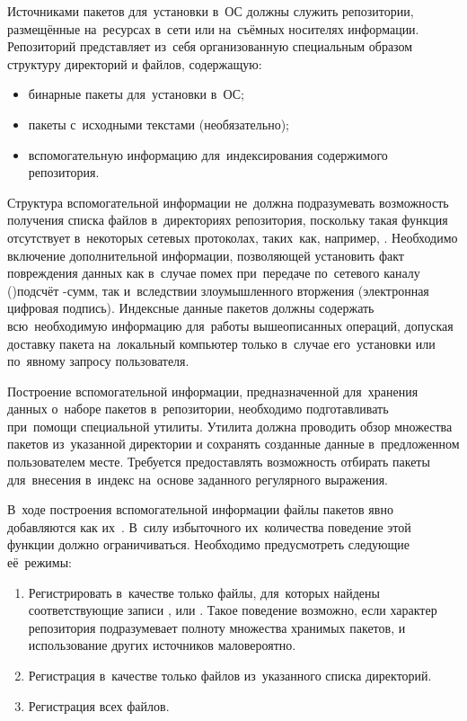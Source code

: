 Источниками пакетов для~установки в~ОС должны служить репозитории,
размещённые на~ресурсах в~сети или на~съёмных носителях информации.
Репозиторий представляет из~себя организованную специальным образом структуру директорий и файлов, содержащую:

\begin{itemize}
\item{бинарные пакеты для~установки в~ОС;}
\item{пакеты с~исходными текстами (необязательно);}
\item{вспомогательную информацию для~индексирования содержимого репозитория.}
\end{itemize}

Структура вспомогательной информации не~должна подразумевать возможность получения списка файлов в~директориях репозитория,
поскольку такая функция отсутствует в~некоторых сетевых протоколах, таких~как, например, .
Необходимо включение дополнительной информации, позволяющей установить факт повреждения данных как в~случае 
помех при~передаче по~сетевого каналу ()подсчёт -сумм, 
так и~вследствии злоумышленного вторжения (электронная цифровая подпись).
Индексные данные пакетов должны содержать всю~необходимую информацию для~работы вышеописанных операций,
допуская доставку пакета на~локальный компьютер только в~случае его~установки или по~явному запросу пользователя.

Построение вспомогательной информации, предназначенной для~хранения данных о~наборе пакетов в~репозитории,
необходимо подготавливать при~помощи специальной утилиты.
Утилита должна проводить обзор множества пакетов из~указанной директории и сохранять созданные данные в~предложенном пользователем месте.
Требуется предоставлять возможность отбирать пакеты для~внесения в~индекс на~основе заданного регулярного выражения.

В~ходе построения вспомогательной информации файлы пакетов явно добавляются как их~.
В~силу избыточного их~количества поведение этой функции должно ограничиваться.
Необходимо предусмотреть следующие её~режимы:

\begin{enumerate}

\item {
Регистрировать в~качестве  только файлы,
для~которых найдены соответствующие записи ,  или .
Такое поведение возможно, если характер репозитория подразумевает полноту множества хранимых пакетов,
 и использование других источников маловероятно.
}

\item {
Регистрация в~качестве  только файлов из~указанного списка директорий.
}

\item {
Регистрация всех файлов.
}

\end{enumerate}

